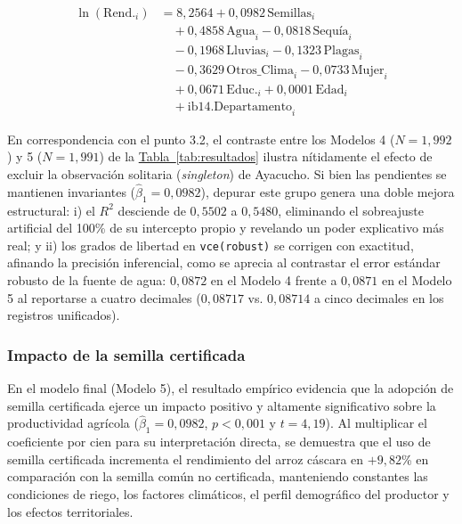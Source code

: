 \documentclass[11pt,a4paper,twocolumn]{article}
\newcommand{\semcert}{\text{Semillas}}
\begin{document}
\begin{equation}
\begin{split}
\ln(\text{Rend.}_i) &= 8{,}2564 + 0{,}0982 \, \semcert_i \\
&\quad + 0{,}4858 \, \text{Agua}_i - 0{,}0818 \, \text{Sequía}_i \\
&\quad - 0{,}1968 \, \text{Lluvias}_i - 0{,}1323 \, \text{Plagas}_i \\
&\quad - 0{,}3629 \, \text{Otros\_Clima}_i - 0{,}0733 \, \text{Mujer}_i \\
&\quad + 0{,}0671 \, \text{Educ.}_i + 0{,}0001 \, \text{Edad}_i \\
&\quad + \text{ib14.Departamento}_i
\end{split}
\end{equation}

En correspondencia con el punto 3.2, el contraste entre los Modelos 4 ($N=1{,}992$) y 5 ($N=1{,}991$) de la \hyperref[tab:resultados]{Tabla~\ref*{tab:resultados}} ilustra nítidamente el efecto de excluir la observación solitaria (\textit{singleton}) de Ayacucho. Si bien las pendientes se mantienen invariantes ($\hat{\beta}_1 = 0{,}0982$), depurar este grupo genera una doble mejora estructural: i) el $R^2$ desciende de $0{,}5502$ a $0{,}5480$, eliminando el sobreajuste artificial del 100\% de su intercepto propio y revelando un poder explicativo más real; y ii) los grados de libertad en \texttt{vce(robust)} se corrigen con exactitud, afinando la precisión inferencial, como se aprecia al contrastar el error estándar robusto de la fuente de agua: $0{,}0872$ en el Modelo 4 frente a $0{,}0871$ en el Modelo 5 al reportarse a cuatro decimales ($0{,}08717$ vs. $0{,}08714$ a cinco decimales en los registros unificados).

\subsubsection{Impacto de la semilla certificada}
En el modelo final (Modelo 5), el resultado empírico evidencia que la adopción de semilla certificada ejerce un impacto positivo y altamente significativo sobre la productividad agrícola ($\hat{\beta}_1 = 0{,}0982$, $p < 0{,}001$ y $t = 4{,}19$). Al multiplicar el coeficiente por cien para su interpretación directa, se demuestra que el uso de semilla certificada incrementa el rendimiento del arroz cáscara en $+9{,}82$\% en comparación con la semilla común no certificada, manteniendo constantes las condiciones de riego, los factores climáticos, el perfil demográfico del productor y los efectos territoriales.
\end{document}
